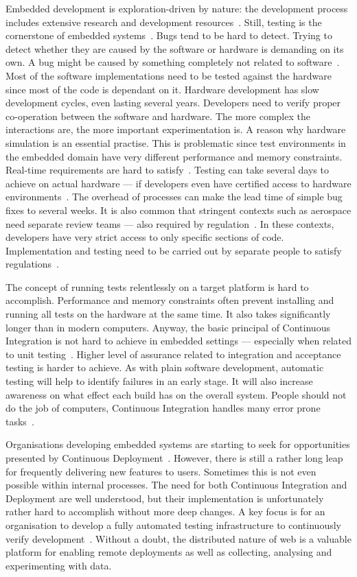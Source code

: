 \documentclass[english]{tktltiki2}
\begin{document}
Embedded development is exploration-driven by nature: the development process includes extensive research and development resources~\cite{EHS14}. Still, testing is the cornerstone of embedded systems~\cite{RA03, HAB12, KRM13, EHS14, Ngy15}. Bugs tend to be hard to detect. Trying to detect whether they are caused by the software or hardware is demanding on its own. A bug might be caused by something completely not related to software~\cite{Ngy15}. Most of the software implementations need to be tested against the hardware since most of the code is dependant on it. Hardware development has slow development cycles, even lasting several years. Developers need to verify proper co-operation between the software and hardware. The more complex the interactions are, the more important experimentation is. A reason why hardware simulation is an essential practise. This is problematic since test environments in the embedded domain have very different performance and memory constraints. Real-time requirements are hard to satisfy~\cite{RA03, HMP12}. Testing can take several days to achieve on actual hardware — if developers even have certified access to hardware environments~\cite{VB09}. The overhead of processes can make the lead time of simple bug fixes to several weeks. It is also common that stringent contexts such as aerospace need separate review teams — also required by regulation~\cite{VB09}. In these contexts, developers have very strict access to only specific sections of code. Implementation and testing need to be carried out by separate people to satisfy regulations~\cite{VB09, JLP12}.

The concept of running tests relentlessly on a target platform is hard to accomplish. Performance and memory constraints often prevent installing and running all tests on the hardware at the same time. It also takes significantly longer than in modern computers. Anyway, the basic principal of Continuous Integration is not hard to achieve in embedded settings — especially when related to unit testing~\cite{RA03, KRM13}. Higher level of assurance related to integration and acceptance testing is harder to achieve. As with plain software development, automatic testing will help to identify failures in an early stage. It will also increase awareness on what effect each build has on the overall system. People should not do the job of computers, Continuous Integration handles many error prone tasks~\cite{Ngy15}.

Organisations developing embedded systems are starting to seek for opportunities presented by Continuous Deployment~\cite{HAB12}. However, there is still a rather long leap for frequently delivering new features to users. Sometimes this is not even possible within internal processes. The need for both Continuous Integration and Deployment are well understood, but their implementation is unfortunately rather hard to accomplish without more deep changes. A key focus is for an organisation to develop a fully automated testing infrastructure to continuously verify development~\cite{HAB12}. Without a doubt, the distributed nature of web is a valuable platform for enabling remote deployments as well as collecting, analysing and experimenting with data.
\end{document}
